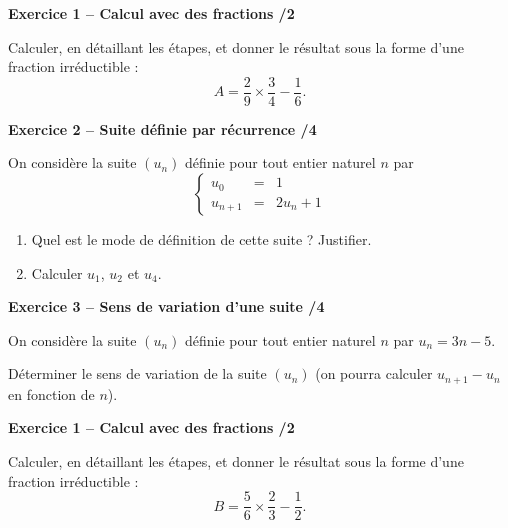 \documentclass[10pt,a4paper]{article}
\begin{document}


\textbf{Exercice 1 -- Calcul avec des fractions \hfill /2}

Calculer, en détaillant les étapes, et donner le résultat sous la forme d'une fraction irréductible :
\[
A = \frac{2}{9}\times\frac{3}{4}-\frac{1}{6}.
\]

\vspace{3cm}

\textbf{Exercice 2 -- Suite définie par récurrence \hfill /4}

On considère la suite \((u_n)\) définie pour tout entier naturel \(n\) par
\[
\left\{\begin{array}{rcl}
u_0 &=& 1 \\
u_{n+1} &=& 2u_n+1
\end{array}\right.
\]

\begin{enumerate}
\item Quel est le mode de définition de cette suite ? Justifier.

\vspace{2cm}

\item Calculer \(u_1\), \(u_2\) et \(u_4\).
\end{enumerate}

\vspace{3cm}

\textbf{Exercice 3 -- Sens de variation d'une suite \hfill /4}

On considère la suite \((u_n)\) définie pour tout entier naturel \(n\) par \(u_n=3n-5\).

Déterminer le sens de variation de la suite \((u_n)\) (on pourra calculer \(u_{n+1}-u_n\) en fonction de \(n\)).

\newpage



\textbf{Exercice 1 -- Calcul avec des fractions \hfill /2}

Calculer, en détaillant les étapes, et donner le résultat sous la forme d'une fraction irréductible :
\[
B = \frac{5}{6}\times\frac{2}{3}-\frac{1}{2}.
\]
\end{document}
